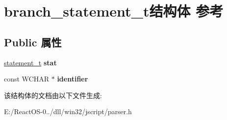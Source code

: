\hypertarget{structbranch__statement__t}{}\section{branch\+\_\+statement\+\_\+t结构体 参考}
\label{structbranch__statement__t}
\subsection*{Public 属性}
\begin{DoxyCompactItemize}
\item 
\mbox{\label{structbranch__statement__t_a6bc3985b739ba10caea9fb3ff12b8332}} 
\hyperlink{struct__statement__t}{statement\+\_\+t} {\bfseries stat}
\item 
\mbox{\label{structbranch__statement__t_a74233aabb758ef5515b8bbb7f18d327b}} 
const W\+C\+H\+AR $\ast$ {\bfseries identifier}
\end{DoxyCompactItemize}


该结构体的文档由以下文件生成\+:\begin{DoxyCompactItemize}
\item 
E\+:/\+React\+O\+S-\/0../dll/win32/jscript/parser.\+h\end{DoxyCompactItemize}
